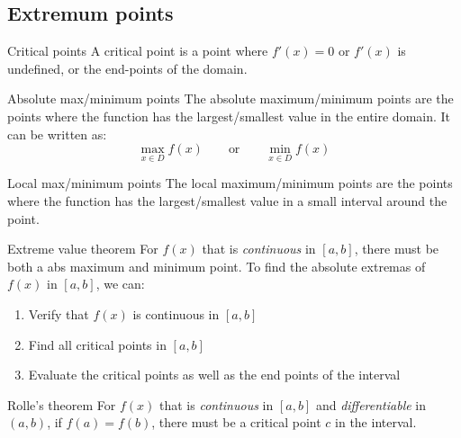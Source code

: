 \documentclass{article}
\begin{document}
\subsection{Extremum points}
\begin{definition}
    {Critical points}
    A critical point is a point where $f'(x)=0$ or $f'(x)$ is undefined, or the end-points of the domain.
\end{definition}
\begin{definition}
    {Absolute max/minimum points}
    The absolute maximum/minimum points are the points where the function has the largest/smallest value in the entire domain. It can be written as:
    \[\max_{x\in D}f(x)\quad\quad\text{or}\quad\quad\min_{x\in D}f(x)\]
\end{definition}
\begin{definition}
    {Local max/minimum points}
    The local maximum/minimum points are the points where the function has the largest/smallest value in a small interval around the point.
\end{definition}
\begin{theorem}
    {Extreme value theorem}
    For $f(x)$ that is \emph{continuous} in $[a,b]$, there must be both a abs maximum and minimum point.
    \tcblower
    To find the absolute extremas of $f(x)$ in $[a,b]$, we can:
    \begin{enumerate}
        \item Verify that $f(x)$ is continuous in $[a,b]$
        \item Find all critical points in $[a,b]$
        \item Evaluate the critical points as well as the end points of the interval
    \end{enumerate}
\end{theorem}
\begin{theorem}
    {Rolle's theorem}
    For $f(x)$ that is \emph{continuous} in $[a,b]$ and \emph{differentiable} in $(a,b)$, if $f(a)=f(b)$, there must be a critical point $c$ in the interval.
\end{theorem}
\end{document}
